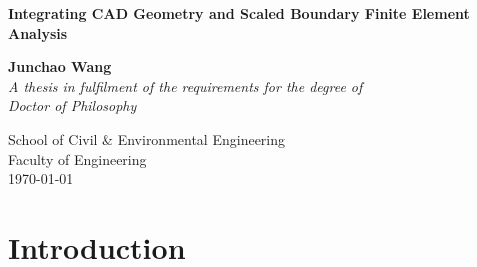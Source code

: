 \documentclass[a4paper,12pt,oneside]{book}
\begin{document}

\begin{titlepage}
    \begin{center}
    \linespread{1.5}
    { \huge \bfseries Integrating CAD Geometry and Scaled Boundary Finite Element Analysis \par }
    \vspace{1.5cm}
    { \large \bfseries Junchao Wang }
    \\[1.5cm]
    { \it A thesis in fulfilment of the requirements for the degree of }\\
    { \it Doctor of Philosophy } \\

    \begin{figure}[h!]
        \centering
    \end{figure}

    { School of Civil \& Environmental Engineering}\\
    { Faculty of Engineering}
    \\[1.5cm]
    { \today }

    \end{center}
\end{titlepage}


\chapter{Introduction}
    







\end{document}
